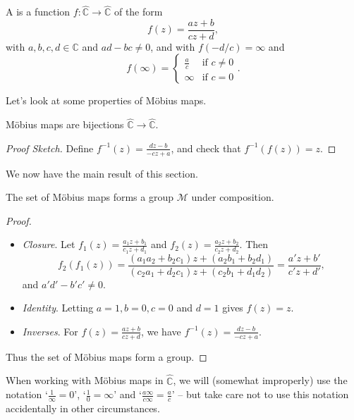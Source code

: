 \documentclass[a4paper]{scrartcl}
\begin{document}
\begin{definition}
	A  is a function $f : \hat{\mathbb{C}} \rightarrow \hat{\mathbb{C}}$ of the form
	$$
	f(z) = \frac{az + b}{cz + d},
	$$
	with $a, b, c, d \in \mathbb{C}$ and $ad - bc \neq 0$, and with $f(-d/c) = \infty$ and 
	$$
	f(\infty) = \begin{cases}
	   \frac{a}{c} &\mbox{if } c \neq 0 \\
	   \infty &\mbox{if } c = 0
	   \end{cases}.
	$$
\end{definition}

Let's look at some properties of Möbius maps.

\begin{proposition}
	Möbius maps are bijections $\hat{\mathbb{C}} \rightarrow \hat{\mathbb{C}}$.
\end{proposition}
\begin{proof}[Proof Sketch]
	Define $f^{-1}(z) = \frac{dz - b}{-cz + a}$, and check that $f^{-1}(f(z)) = z$.
\end{proof}

We now have the main result of this section.

\begin{theorem}
	The set of Möbius maps forms a group $\mathcal{M}$ under composition.
\end{theorem}
\begin{proof}$ $
	\begin{itemize}
		\item \emph{Closure}. Let $f_1(z) = \frac{a_1 z + b_1}{c_1 z + d_1}$ and $f_2(z) = \frac{a_2 z + b_2}{c_2 z + d_2}$. Then
		$$
		f_2(f_1(z)) = \frac{(a_1 a_2 + b_2 c_1)z + (a_2 b_1 + b_2 d_1)}{(c_2 a_1 + d_2 c_1)z + (c_2 b_1+ d_1 d_2)} = \frac{a' z + b'}{c' z + d'},
		$$
		and $a' d' - b' c' \neq 0$.
		\item \emph{Identity}. Letting $a = 1, b = 0, c = 0$ and $d = 1$ gives $f(z) = z$.
		\item \emph{Inverses}. For $f(z) = \frac{az + b}{cz + d}$, we have $f^{-1}(z) = \frac{dz - b}{-cz + a}$. 
	\end{itemize}
	Thus the set of Möbius maps form a group.
\end{proof}

\begin{remark}
	When working with Möbius maps in $\hat{\mathbb{C}}$, we will (somewhat improperly) use the notation `$\frac{1}{\infty} = 0$', `$\frac{1}{0} = \infty$' and `$\frac{a\infty}{c \infty} = \frac{a}{c}$' -- but take care not to use this notation accidentally in other circumstances.
\end{remark}
\end{document}
